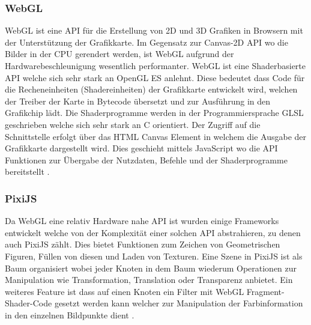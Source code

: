 \subsubsection{WebGL}
\label{sec:WebGL}
WebGL ist eine API für die Erstellung von 2D und 3D Grafiken in Browsern mit der Unterstützung der Grafikkarte.
Im Gegensatz zur Canvas-2D API wo die Bilder in der CPU gerendert werden, ist WebGL aufgrund der Hardwarebeschleunigung wesentlich performanter.
WebGL ist eine Shaderbasierte API welche sich sehr stark an OpenGL ES anlehnt.
Diese bedeutet dass Code für die Recheneinheiten (Shadereinheiten) der Grafikkarte entwickelt wird,
welchen der Treiber der Karte in Bytecode übersetzt und zur Ausführung in den Grafikchip lädt.
Die Shaderprogramme werden in der Programmiersprache GLSL geschrieben welche sich sehr stark an C orientiert.
Der Zugriff auf die Schnittstelle erfolgt über das HTML Canvas Element in welchem die Ausgabe der Grafikkarte dargestellt wird.
Dies geschieht mittels JavaScript wo die API Funktionen zur Übergabe der Nutzdaten, Befehle und der Shaderprogramme bereitstellt \cite{webgl-14}.

\subsubsection{PixiJS}
\label{sec:PixiJS}
Da WebGL eine relativ Hardware nahe API ist wurden einige Frameworks entwickelt welche von der Komplexität einer solchen API abstrahieren, zu denen auch PixiJS zählt.
Dies bietet Funktionen zum Zeichen von Geometrischen Figuren, Füllen von diesen und Laden von Texturen.
Eine Szene in PixiJS ist als Baum organisiert wobei jeder Knoten in dem Baum wiederum Operationen zur Manipulation wie Transformation, Translation oder Transparenz anbietet.
Ein weiteres Feature ist dass auf einen Knoten ein Filter mit WebGL Fragment-Shader-Code gesetzt werden kann welcher zur Manipulation der Farbinformation in den einzelnen Bildpunkte dient \cite{pixijs}.


